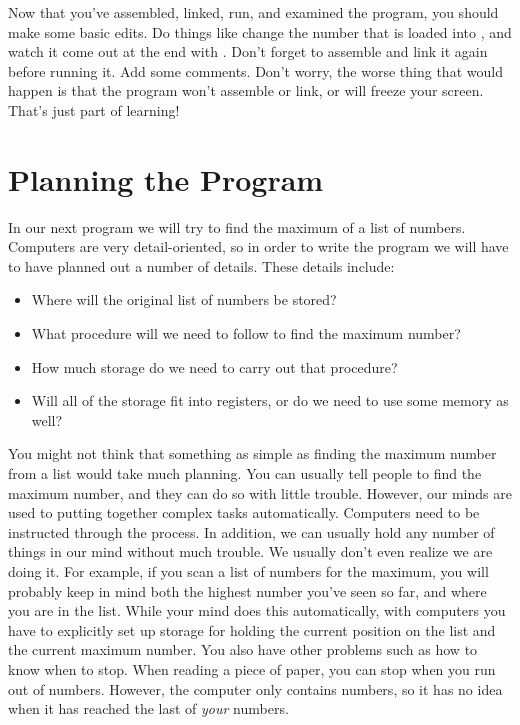 Now that you've assembled, linked, run, and examined the program, you
should make some basic edits.  Do things like change the number 
that is loaded into \icode{{\ebxBare}}, and watch it come out
at the end with .  Don't forget
to assemble and link it again before running it.
Add some comments.  Don't worry, the worse thing that would happen is that the 
program won't assemble or link, or will freeze your screen.  That's just
part of learning!

\section{Planning the Program}

In our next program we will try to find the maximum of a list of numbers.
Computers are very detail-oriented, so in order to write the program we
will have to have planned out a number of details.  These details include:

\begin{itemize}\item Where will the original list of numbers be stored? 
\item What procedure will we need to follow to find the maximum number? 
\item How much storage do we need to carry out that procedure? 
\item Will all of the storage fit into registers, or do we need to use some memory as well? 
\end{itemize}

You might not think that something as simple as finding the maximum number from
a list would take much planning.  You can usually tell people to find the 
maximum number, and they can do so with little trouble.  However, our minds
are used to putting together complex tasks automatically.  Computers need
to be instructed through the process.  In addition, we can usually hold any
number of things in our mind without much trouble.  We usually don't even
realize we are doing it.  For example, if you scan a list of numbers for the
maximum, you will probably keep in mind both the highest number you've seen
so far, and where you are in the list.  While your mind does this
automatically, with computers you have to explicitly set up storage for holding
the current position on the list and the current maximum number.  You also
have other problems such as how to know when to stop.  When reading a piece
of paper, you can stop when you run out of numbers.  However, the computer
only contains numbers, so it has no idea when it has reached the last of 
\emph{your} numbers.

